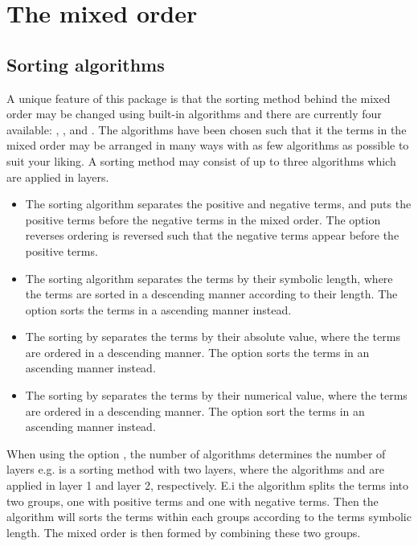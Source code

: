 	
	
	\clearpage
	\section{The mixed order} \label{ssec:overall_order}
	
	\subsection{Sorting algorithms} \label{ssec:sort-method}
	A unique feature of this package is that the sorting method behind the mixed order may be changed using built-in algorithms and there are currently four available: , ,  and . The algorithms have been chosen such that it the terms in the mixed order may be arranged in many ways with as few algorithms as possible to suit your liking. A sorting method may consist of up to three algorithms which are applied in layers.
	
	\begin{itemize}
		\item The sorting algorithm  separates the positive and negative terms, and puts the positive terms before the negative terms in the mixed order. The option  reverses ordering is reversed such that the negative terms appear before the positive terms.
		\item The sorting algorithm  separates the terms by their symbolic length, where the terms are sorted in a descending manner according to their length. The option  sorts the terms in a ascending manner instead.
		\item The sorting by  separates the terms by their absolute value, where the terms are ordered in a descending manner. The option  sorts the terms in an ascending manner instead.
		\item The sorting by  separates the terms by their numerical value, where the terms are ordered in a descending manner. The option  sort the terms in an ascending manner instead.
	\end{itemize}
	
	When using the option , the number of algorithms determines the number of layers e.g.  is a sorting method with two layers, where the algorithms  and  are applied in layer \num{1} and layer \num{2}, respectively. E.i the  algorithm splits the terms into two groups, one with positive terms and one with negative terms. Then the  algorithm will sorts the terms within each groups according to the terms symbolic length. The mixed order is then formed by combining these two groups.
	

